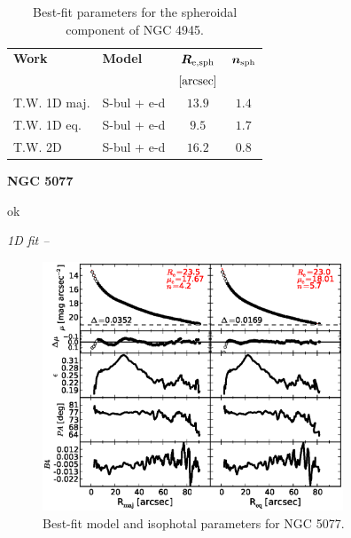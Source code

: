 \documentclass[preprint2]{emulateapj}
\newcommand{\fitfigurewidth}{0.8\textwidth}
\begin{document}
  \begin{table}[h]
  \small
  \caption{Best-fit parameters for the spheroidal component of NGC 4945.}
  \begin{center}
  \begin{tabular}{llcc}
  \hline
  {\bf Work} & {\bf Model}   & $\bm R_{\rm e,sph}$    & $\bm n_{\rm sph}$ \\
    &  &  $[\rm arcsec]$ & \\
  \hline
  T.W. 1D maj. & S-bul + e-d & $13.9$  &  $1.4$ \\
  T.W. 1D eq.  & S-bul + e-d & $9.5$   &  $1.7$ \\
  T.W. 2D      & S-bul + e-d & $16.2$  &  $0.8$ \\
  \hline
  \end{tabular}
  \end{center}
  \label{tab:n4945}
  \end{table}


  \clearpage\newpage\noindent
  {\bf NGC 5077 \\}

  ok

  \emph{1D fit -- }

  \begin{figure}[h]
  \begin{center}
  \includegraphics[width=\fitfigurewidth]{images/n5077_1Dfit.eps}
  \caption{Best-fit model and isophotal parameters for NGC 5077.}
  \end{center}
  \end{figure}
\end{document}
